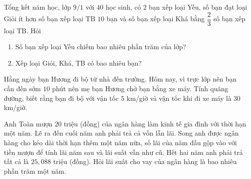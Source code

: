 \begin{bt}%
	Tổng kết năm học, lớp $9/1$ với $40$ học sinh, có $2$ bạn xếp loại Yếu, số bạn đạt loại Giỏi ít hơn số bạn xếp loại TB $10$ bạn và số bạn xếp loại Khá bằng $\dfrac{2}{3}$ số bạn xếp loại TB. Hỏi
	\begin{enumerate}
		\item Số bạn xếp loại Yếu chiếm bao nhiêu phần trăm của lớp?
		\item Xếp loại Giỏi, Khá, TB có bao nhiêu bạn?
	\end{enumerate} 
\end{bt}

\begin{bt}%
	Hằng ngày bạn Hương đi bộ từ nhà đến trường. Hôm nay, vì trực lớp nên bạn cần đến sớm $10$ phút nên mẹ bạn Hương chở bạn bằng xe máy. Tính quãng đường, biết rằng bạn đi bộ với vận tốc $5$ km/giờ và vận tốc khi đi xe máy là $30$ km/giờ.
\end{bt}

\begin{bt}%
	Anh Toàn mượn $20$ triệu (đồng) của ngân hàng làm kinh tế gia đình với thời hạn một năm. Lẽ ra đến cuối năm anh phải trả cả vốn lẫn lãi. Song anh được ngân hàng cho kéo dài thời hạn thêm một năm nữa, số lãi của năm đầu gộp vào với tiền mượn để tính lãi năm sau và lãi suất vẫn như cũ. Hết hai năm anh phải trả tất cả là $25{,}088$ triệu (đồng). Hỏi lãi suất cho vay của ngân hàng là bao nhiêu phần trăm một năm.
\end{bt}


